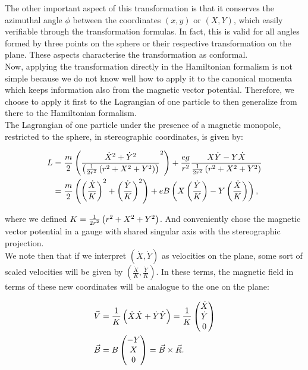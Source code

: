 The other important aspect of this transformation is that it conserves the azimuthal angle $\phi$ between the coordinates $(x,y)$ or $(X,Y)$, which easily verifiable through the transformation formulas. In fact, this is valid for all angles formed by three points on the sphere or their respective transformation on the plane. These aspects characterise the transformation as conformal.\\

Now, applying the transformation directly in the Hamiltonian formalism is not simple because we do not know well how to apply it to the canonical momenta which keeps information also from the magnetic vector potential. Therefore, we choose to apply it first to the Lagrangian of one particle to then generalize from there to the Hamiltonian formalism.\\

The Lagrangian of one particle under the presence of a magnetic monopole, restricted to the sphere, in stereographic coordinates, is given by:

\begin{align}
L &= \frac{m}{2}\left( \frac{\dot{X}^2+\dot{Y}^2}{\left( \frac{1}{2r^2}\left( r^2+X^2+Y^2 \right) \right)}^2 \right) + \frac{eg}{r^2}\frac{X\dot{Y}-Y\dot{X}}{\frac{1}{2r^2}\left( r^2+X^2+Y^2 \right)} \nonumber \\
&= \frac{m}{2}\left( \left( \frac{\dot{X}}{K} \right)^2+\left( \frac{\dot{Y}}{K} \right)^2 \right) + eB\left( X\left( \frac{\dot{Y}}{K} \right)-Y\left( \frac{\dot{X}}{K} \right) \right),
\end{align}

where we defined $K=\frac{1}{2r^2}\left( r^2+X^2+Y^2 \right)$. And conveniently chose the magnetic vector potential in a gauge with shared singular axis with the stereographic projection.\\

We note then that if we interpret $(\dot{X},\dot{Y})$ as velocities on the plane, some sort of scaled velocities will be given by $(\frac{\dot{X}}{K},\frac{\dot{Y}}{K})$. In these terms, the magnetic field in terms of these new coordinates will be analogue to the one on the plane:

\begin{align*}
\vec{V} &= \frac{1}{K}\left( \dot{X}\hat{X} + \dot{Y}\hat{Y} \right) = \frac{1}{K}\begin{pmatrix} \dot{X} \\ \dot{Y}\\0 \end{pmatrix} \\
\vec{B} &= B\begin{pmatrix} -Y \\ X \\ 0 \end{pmatrix} = \vec{B}\times \vec{R} .
\end{align*}

